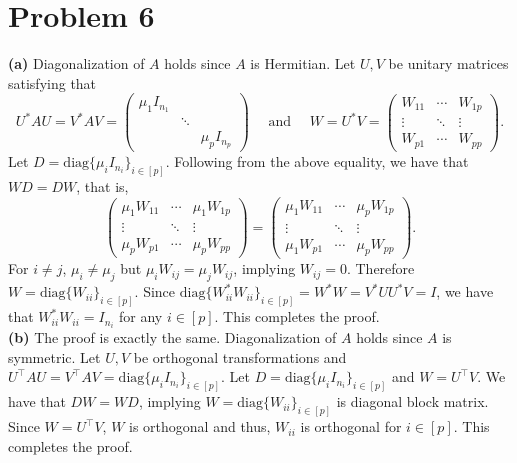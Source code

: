 \documentclass[11pt]{article}
\theoremstyle{plain}
\theoremstyle{definition}
\theoremstyle{remark}
\newcommand{\diag}{\mathrm{diag}}
\begin{document}
\section*{Problem 6}
\textbf{(a)} Diagonalization of $A$ holds since $A$ is Hermitian.
Let $U,V$ be unitary matrices satisfying that
$$
    U^*AU=V^*AV = \begin{pmatrix}
        \mu_1 I_{n_1} & & 
        \\& \ddots &
        \\& & \mu_pI_{n_p}
    \end{pmatrix}\quad\text{ and }\quad
    W = U^*V = \begin{pmatrix}
        W_{11} &\cdots & W_{1p}
        \\\vdots& \ddots &\vdots
        \\W_{p1}&\cdots & W_{pp}
    \end{pmatrix}.
$$
Let $D = \diag\{\mu_i I_{n_i}\}_{i\in[p]}$.
Following from the above equality, we have that $WD=DW$, that is,
$$
    \begin{pmatrix}
        \mu_1W_{11} &\cdots & \mu_1W_{1p}
        \\\vdots& \ddots &\vdots
        \\\mu_pW_{p1}&\cdots & \mu_pW_{pp}
    \end{pmatrix} = \begin{pmatrix}
        \mu_1W_{11} &\cdots & \mu_pW_{1p}
        \\\vdots& \ddots &\vdots
        \\\mu_1W_{p1}&\cdots & \mu_pW_{pp}
    \end{pmatrix} .
$$
For $i\neq j$, $\mu_i\neq \mu_j$ but $\mu_iW_{ij}=\mu_jW_{ij}$, implying $W_{ij}=0$.
Therefore $W = \diag\{W_{ii}\}_{i\in[p]}$.
Since $\diag\{W_{ii}^*W_{ii}\}_{i\in[p]} = W^*W = V^*UU^*V = I$, we have that $W_{ii}^*W_{ii}=I_{n_i}$ for any $i\in[p]$.
This completes the proof.
\\\textbf{(b)} The proof is exactly the same. 
Diagonalization of $A$ holds since $A$ is symmetric.
Let $U,V$ be orthogonal transformations and $U^\top A U = V^\top A V = \diag\{\mu_iI_{n_i}\}_{i\in[p]}$.
Let $D = \diag\{\mu_i I_{n_i}\}_{i\in[p]}$ and $W=U^\top V$.
We have that $DW=WD$, implying $W = \diag\{W_{ii}\}_{i\in[p]}$ is diagonal block matrix.
Since $W = U^\top V$, $W$ is orthogonal and thus, $W_{ii}$ is orthogonal for $i\in [p]$.
This completes the proof.
\end{document}
